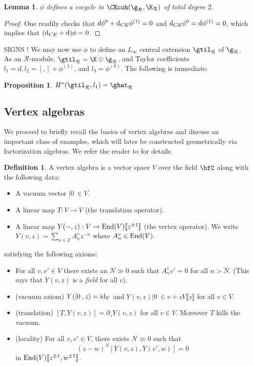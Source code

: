 \documentclass[12pt]{amsart}
\newtheorem{prop}[theorem]{Proposition}
\newtheorem{lemma}[theorem]{Lemma}
\theoremstyle{definition}
\newtheorem{dfn}[theorem]{Definition}
\theoremstyle{remark}
\newcommand{\R}{\mathcal{R}}
\def\d{{\rm d}}
\begin{document}
\begin{lemma}
$\phi$ defines a cocycle in $\CEcoh(\g_{\R}, \K_{\R}) $ of total degree $2$.
\end{lemma}
\begin{proof}
One readily checks that $d \phi^{0} + \d_{CE} \phi^{(1)} = 0 $ and $\d_{CE} \phi^{0} = \d \phi^{(1)} = 0$, which implies that $(\d_{CE} + \d) \phi = 0$.
\end{proof}

{\color{red} SIGNS !}
We may now use $\phi$ to define an $L_{\infty}$ central extension $\gtil_{\R}$ of $\g_{\R}$. As an $\R$-module, $ \gtil_{\R} = \K \oplus \g_{\R} $, and Taylor coefficients $l_1 = d, l_2 = [,] + \phi^{(1)}$, and $l_3 = \phi^{(0)}$. The following is immediate:

\begin{prop}
$H^{*}(\gtil_{\R}, l_1) = \ghat_{\R}$
\end{prop} 

\subsection{Vertex algebras}

We proceed to briefly recall the basics of vertex algebras and discuss an important class of examples, which will later be constructed geometrically via factorization algebras. We refer the reader to \cite{FBZ, Kac} for details. 

\begin{dfn}
A vertex algebra is a vector
space $V$ over the field $\bfC$ along with the following data:
\begin{itemize}
\item A vacuum vector $|0\> \in V$.
\item A linear map $T : V \to V$ (the translation operator).
\item A linear map $Y(-,z) : V \to {\rm End}(V)\llbracket z^{\pm 1}
  \rrbracket$ (the vertex operator). We write $Y(v,z) = \sum_{n \in \mathbb{Z}} A_n^v z^{-n}$
  where $A_n^v \in {\rm End}(V)$. 
\end{itemize} 
satisfying the following axioms:
\begin{itemize}
\item For all $v,v' \in V$ there exists an $N \gg 0$ such that $A_n^v
  v' = 0$ for all $n > N$. (This says that $Y(v,z)$ is a {\it field}
  for all $v$). 
\item (vacuum axiom) $Y(| 0 \>, z) = {\rm id}_V$ and
    $Y(v,z)  |0\> \in v + z V \llbracket z \rrbracket$ for all
    $v \in V$. 
\item (translation) $[T,Y(v,z)] = \partial_z Y(v,z)$ for all $v \in
  V$. Moreover $T$ kills the vacuum. 
\item (locality) For all $v,v' \in V$, there exists $N \gg 0$ such
  that 
\[
(z-w)^N[Y(v,z),Y(v',w)] = 0
\]
in ${\rm End}(V) \llbracket z^{\pm 1},w^{\pm 1}\rrbracket$. 
\end{itemize}
\end{dfn}
\end{document}
